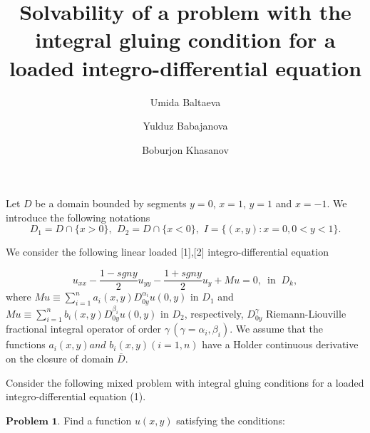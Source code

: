 \documentclass[12pt]{llncs}
\begin{document}
\fi

\title{Solvability of a problem with the integral gluing condition for a loaded integro-differential equation }

\author{Umida Baltaeva \and Yulduz Babajanova \and Boburjon Khasanov
}

\maketitle

\begin{abstract}
\end{abstract}

Let $ D $ be a domain bounded by segments $ y = 0$, $x = 1$, $y = 1$
and $x = -1$. We introduce the following notations
$$D_{1}=D\cap\{x>0\},\,\ D_{2}=D\cap\{x<0\},\,\,I=\{ (x,y):x=0,
0<y<1\}.$$

We consider the following linear loaded [1],[2] integro-differential
equation


\begin{equation}
u_{xx} - {\frac{{1 - sgny}}{{2}}}u_{yy} - {\frac{{1 +
			sgny}}{{2}}}u_{y} + M u=0,\,\textrm{ in }\ D_{k},
\end{equation}
where $M u\equiv\sum\limits_{i=1}^{n}a_{i}(x,y)D_{0y}^{\alpha_{i}}
u(0,y)$ in $D_{1}$ and $M
u\equiv\sum\limits_{i=1}^{n}b_{i}(x,y)D_{0y}^{\beta_{i}}u(0,y)$ in
$D_{2}$, respectively, $D_{0y}^{\gamma }$ Riemann-Liouville
fractional integral operator of order
$\gamma\,(\gamma=\alpha_{i},\beta_{i})$.
 We assume that the functions  $a_{i}(x,y) and $  $ b_{i}(x,y)  (i=1,n) $ have a Holder continuous derivative on the closure of domain $\overline{D}$.

Consider the following mixed problem with integral gluing conditions
for a loaded integro-differential equation (1).

$\textbf{Problem 1.}$ Find a function $u(x,y)$ satisfying the
conditions:
\end{document}
